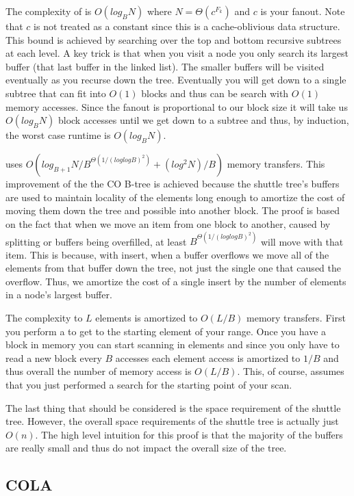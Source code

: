 \documentclass{style}
\begin{document}
The complexity of \Search is $O(log_B N)$ where $N = \Theta(c^{F_k})$ and $c$
is your fanout. Note that $c$ is not treated as a constant since this is a
cache-oblivious data structure. This bound is achieved by searching over the
top and bottom recursive subtrees at each level. A key trick is that when you
visit a node you only search its largest buffer (that last buffer in the
linked list). The smaller buffers will be visited eventually as you recurse
down the tree. Eventually you will get down to a single subtree that can fit
into $O(1)$ blocks and thus can be search with $O(1)$ memory accesses. Since
the fanout is proportional to our block size it will take us $O(log_B N)$
block accesses until we get down to a subtree and thus, by induction, the
worst case runtime is $O(log_B N)$.

\Insert uses $O(log_{B+1} N / B^{\Theta(1/(loglogB)^2)} + (log^2 N) / B)$
memory transfers. This improvement of the the CO B-tree is achieved because
the shuttle tree's buffers are used to maintain locality of the elements long
enough to amortize the cost of moving them down the tree and possible into
another block. The proof is based on the fact that when we move an item from
one block to another, caused by splitting or buffers being overfilled, at
least $B^{\Theta(1/(loglogB)^2)}$ will move with that item. This is because,
with insert, when a buffer overflows we move all of the elements from that
buffer down the tree, not just the single one that caused the overflow. Thus,
we amortize the cost of a single insert by the number of elements in a node's
largest buffer.

The complexity to \Scan $L$ elements is amortized to $O(L/B)$ memory
transfers. First you perform a \Search to get to the starting element of your
range. Once you have a block in memory you can start scanning in elements and
since you only have to read a new block every $B$ accesses each element access
is amortized to $1/B$ and thus overall the number of memory access is
$O(L/B)$. This, of course, assumes that you just performed a search for the
starting point of your scan.

The last thing that should be considered is the space requirement of the
shuttle tree. However, the overall space requirements of the shuttle tree is
actually just $O(n)$. The high level intuition for this proof is that the
majority of the buffers are really small and thus do not impact the overall
size of the tree.

\subsection{COLA}
\end{document}
